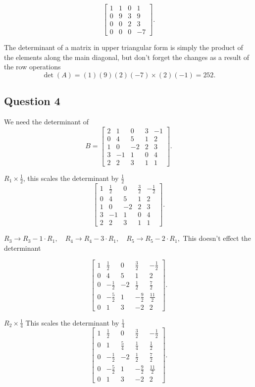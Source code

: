 \documentclass{article}
\begin{document}
\[
\begin{bmatrix}
1 & 1 & 0 & 1 \\
0 & 9 & 3 & 9 \\
0 & 0 & 2 & 3 \\
0 & 0 & 0 & -7
\end{bmatrix}.
\]

The determinant of a matrix in upper triangular form is simply the product of the elements along the
main diagonal, but don't forget the changes as a result of the row operations
\[
\det(A) = (1)(9)(2)(-7) \times (2)(-1) = 252.
\]


\subsection*{Question 4}
We need the determinant of
\[
B =
\begin{bmatrix}
2 & 1 & 0 & 3 & -1 \\
0 & 4 & 5 & 1 & 2 \\
1 & 0 & -2 & 2 & 3 \\
3 & -1 & 1 & 0 & 4 \\
2 & 2 & 3 & 1 & 1
\end{bmatrix}.
\]

\(R_1 \times \tfrac{1}{2}\), this scales the determinant by \(\frac{1}{2}\)
\[
\begin{bmatrix}
1 & \tfrac{1}{2} & 0 & \tfrac{3}{2} & -\tfrac{1}{2} \\
0 & 4 & 5 & 1 & 2 \\
1 & 0 & -2 & 2 & 3 \\
3 & -1 & 1 & 0 & 4 \\
2 & 2 & 3 & 1 & 1
\end{bmatrix}.
\]


\(
R_3 \to R_3 - 1\cdot R_1,\quad
R_4 \to R_4 - 3\cdot R_1,\quad
R_5 \to R_5 - 2\cdot R_1,
\) This doesn't effect the determinant

\[
\begin{bmatrix}
1 & \tfrac{1}{2} & 0 & \tfrac{3}{2} & -\tfrac{1}{2} \\[5pt]
0 & 4 & 5 & 1 & 2 \\[5pt]
0 & -\tfrac{1}{2} & -2 & \tfrac{1}{2} & \tfrac{7}{2} \\[5pt]
0 & -\tfrac{5}{2} & 1 & -\tfrac{9}{2} & \tfrac{11}{2} \\[5pt]
0 & 1 & 3 & -2 & 2
\end{bmatrix}.
\]

\(R_2 \times \tfrac{1}{4}\) This scales the determinant by \(\frac{1}{4}\)
\[
\begin{bmatrix}
1 & \tfrac{1}{2} & 0 & \tfrac{3}{2} & -\tfrac{1}{2} \\[5pt]
0 & 1 & \tfrac{5}{4} & \tfrac{1}{4} & \tfrac{1}{2} \\[5pt]
0 & -\tfrac{1}{2} & -2 & \tfrac{1}{2} & \tfrac{7}{2} \\[5pt]
0 & -\tfrac{5}{2} & 1 & -\tfrac{9}{2} & \tfrac{11}{2} \\[5pt]
0 & 1 & 3 & -2 & 2
\end{bmatrix}.
\]
\end{document}
